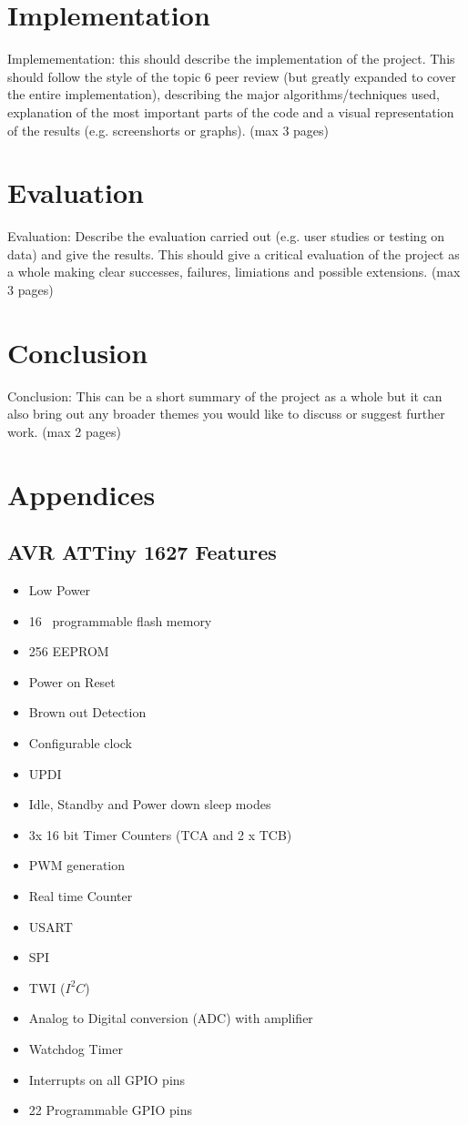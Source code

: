\documentclass[11pt,a4paper,titlepage]{report}
\begin{document}
	\chapter*{Implementation}
	Implemementation: this should describe the implementation of the project. This should follow the style of the topic 6 peer review (but greatly expanded to cover the entire implementation), describing the major algorithms/techniques used, explanation of the most important parts of the code and a visual representation of the results (e.g. screenshorts or graphs). (max 3 pages)
	
	\chapter*{Evaluation}
	Evaluation: Describe the evaluation carried out (e.g. user studies or testing on data) and give the results. This should give a critical evaluation of the project as a whole making clear successes, failures, limiations and possible extensions. (max 3 pages)
	
	\chapter*{Conclusion}
	Conclusion: This can be a short summary of the project as a whole but it can also bring out any broader themes you would like to discuss or suggest further work. (max 2 pages)
	
	\chapter*{Appendices}
	\section{AVR ATTiny 1627 Features}\label{appendix:attiny_features}
	\begin{itemize}
		\item Low Power
		\item 16\unit{\kilo\byte} programmable flash memory
		\item 256\unit{\byte} EEPROM
		\item Power on Reset
		\item Brown out Detection
		\item Configurable clock
		\item UPDI
		\item Idle, Standby and Power down sleep modes
		\item 3x 16 bit Timer Counters (TCA and 2 x TCB)
		\item PWM generation
		\item Real time Counter
		\item USART
		\item SPI
		\item TWI ($I^{2}C$)
		\item Analog to Digital conversion (ADC) with amplifier
		\item Watchdog Timer
		\item Interrupts on all GPIO pins
		\item 22 Programmable GPIO pins
	\end{itemize}
	
\end{document}
